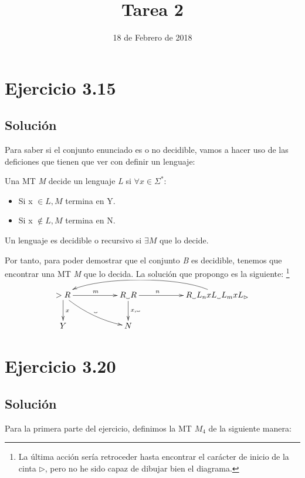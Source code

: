 \documentclass[11pt, a4paper, titlepage]{article}
\newcommand\vartextvisiblespace[1][.5em]{%
  \makebox[#1]{%
    \kern.07em
    \vrule height.3ex
    \hrulefill
    \vrule height.3ex
    \kern.07em
  }%
}
\begin{document}
\title{Tarea 2}
\date{18 de Febrero de 2018}
\maketitle
\newpage



\section*{Ejercicio 3.15}
\subsection*{Solución}


Para saber si el conjunto enunciado es o no decidible, vamos a hacer uso de las
deficiones que tienen que ver con definir un lenguaje:

Una MT \textit{M} decide un lenguaje \textit{L} si $\forall x \in \Sigma^*:$
\begin{itemize}
  \item Si x $\in \textit{L}, \textit{M}$ termina en Y.
  \item Si x $\notin \textit{L}, \textit{M}$ termina en N.
\end{itemize}

Un lenguaje es decidible o recursivo si $\exists \textit{M}$ que lo decide.


Por tanto, para poder demostrar que el conjunto \textit{B} es decidible, tenemos
que encontrar una MT \textit{M} que lo decida. La solución que propongo es la
siguiente: \footnote{La última acción sería retroceder hasta encontrar el
carácter de inicio de la cinta $\rhd$, pero no he sido capaz de dibujar bien el
diagrama.}

\[
\xymatrix{
  >R \ar[rr]^{m} \ar[d]^{x} \ar@/_/[rrd]^{\vartextvisiblespace} & & R_{\vartextvisiblespace}R \ar[d]^{x,\vartextvisiblespace} \ar[rr]^(.33){n} && R_{\vartextvisiblespace}L_{n}xL_{\vartextvisiblespace}L_{m}xL_{\rhd} \ar@(ul,ur)[llll] \\
  Y &&N
}
\]

\section*{Ejercicio 3.20}
\subsection*{Solución}

Para la primera parte del ejercicio, definimos la MT $M_4$ de la siguiente
manera:
\end{document}
